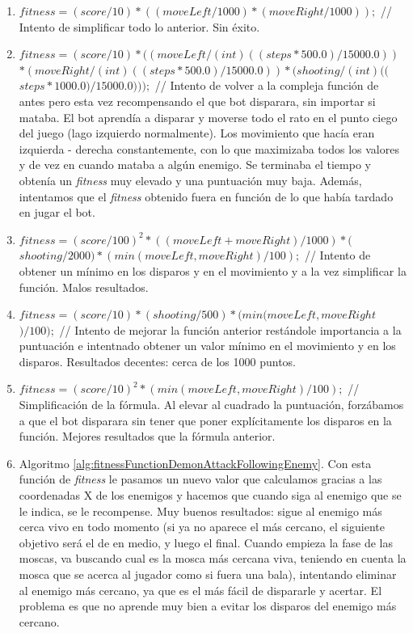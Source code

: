 \begin{enumerate}
\begin{enumerate}
        \item $fitness = (score / 10) * ((moveLeft / 1000) * (moveRight / 1000));$ // Intento de simplificar todo lo anterior. Sin éxito.
        \item $fitness = (score / 10) * ((moveLeft / (int)((steps * 500.0) / 15000.0))$ $* (moveRight / (int)((steps * 500.0) / 15000.0)) * (shooting / (int)(($ $steps * 1000.0) / 15000.0)));$ // Intento de volver a la compleja función de antes pero esta vez recompensando el que bot disparara, sin importar si mataba. El bot aprendía a disparar y moverse todo el rato en el punto ciego del juego (lago izquierdo normalmente). Los movimiento que hacía eran izquierda - derecha constantemente, con lo que maximizaba todos los valores y de vez en cuando mataba a algún enemigo. Se terminaba el tiempo y obtenía un \textit{fitness} muy elevado y una puntuación muy baja. Además, intentamos que el \textit{fitness} obtenido fuera en función de lo que había tardado en jugar el bot.
        \item $fitness = (score / 100)^{2} * ((moveLeft + moveRight) / 1000) * ($ $shooting / 2000) * (min(moveLeft, moveRight) / 100);$ // Intento de obtener un mínimo en los disparos y en el movimiento y a la vez simplificar la función. Malos resultados.
        \item $fitness = (score / 10) * (shooting / 500) * (min(moveLeft, moveRight$ $) / 100);$ // Intento de mejorar la función anterior restándole importancia a la puntuación e intentnado obtener un valor mínimo en el movimiento y en los disparos. Resultados decentes: cerca de los 1000 puntos.
        \item $fitness = (score / 10)^{2} * (min(moveLeft, moveRight) / 100);$ // Simplificación de la fórmula. Al elevar al cuadrado la puntuación, forzábamos a que el bot disparara sin tener que poner explícitamente los disparos en la función. Mejores resultados que la fórmula anterior.
        \item Algoritmo \ref{alg:fitnessFunctionDemonAttackFollowingEnemy}. Con esta función de \textit{fitness} le pasamos un nuevo valor que calculamos gracias a las coordenadas X de los enemigos y hacemos que cuando siga al enemigo que se le indica, se le recompense. Muy buenos resultados: sigue al enemigo más cerca vivo en todo momento (si ya no aparece el más cercano, el siguiente objetivo será el de en medio, y luego el final. Cuando empieza la fase de las moscas, va buscando cual es la mosca más cercana viva, teniendo en cuenta la mosca que se acerca al jugador como si fuera una bala), intentando eliminar al enemigo más cercano, ya que es el más fácil de dispararle y acertar. El problema es que no aprende muy bien a evitar los disparos del enemigo más cercano.

\end{enumerate}
\end{enumerate}
